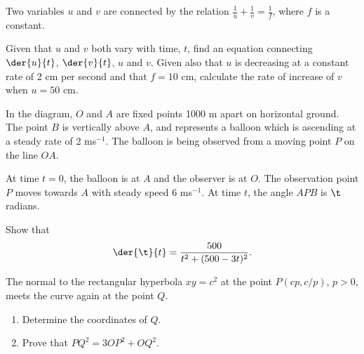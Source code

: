 \begin{problem}
    Two variables $u$ and $v$ are connected by the relation $\frac1u + \frac1v = \frac1f$, where $f$ is a constant.

    Given that $u$ and $v$ both vary with time, $t$, find an equation connecting $\der{u}{t}$, $\der{v}{t}$, $u$ and $v$. Given also that $u$ is decreasing at a constant rate of 2 cm per second and that $f=10$ cm, calculate the rate of increase of $v$ when $u=50$ cm.
\end{problem}

\begin{problem}
    In the diagram, $O$ and $A$ are fixed points 1000 m apart on horizontal ground. The point $B$ is vertically above $A$, and represents a balloon which is ascending at a steady rate of 2 ms$^{-1}$. The balloon is being observed from a moving point $P$ on the line $OA$.

    \begin{center}
    \end{center}

    At time $t=0$, the balloon is at $A$ and the observer is at $O$. The observation point $P$ moves towards $A$ with steady speed 6 ms$^{-1}$. At time $t$, the angle $APB$ is $\t$ radians.

    Show that \[\der{\t}{t} = \frac{500}{t^2 + (500 - 3t)^2}.\]
\end{problem}

\begin{problem}[\chili]
    The normal to the rectangular hyperbola $xy = c^2$ at the point $P(cp, c/p)$, $p > 0$, meets the curve again at the point $Q$.
    \begin{enumerate}
        \item Determine the coordinates of $Q$.
        \item Prove that $PQ^2 = 3 OP^2 + OQ^2$.
    \end{enumerate}
\end{problem}